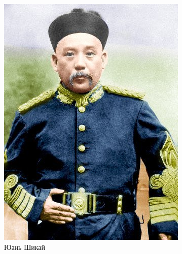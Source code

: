 \begin{figure}[h!tb] 
	\centering\includegraphics[scale=0.4]{Glava3/N47wYPEMph0.jpg}
	\caption{Юань Шикай}%
\end{figure}
